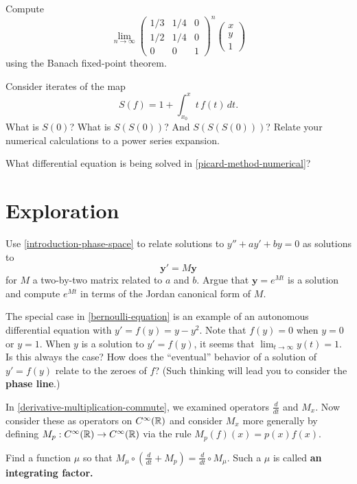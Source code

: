 \documentclass{homework}
\begin{document}
\begin{problem}
  Compute
  \[
    \lim_{n \to \infty} \begin{pmatrix} 1/3 & 1/4 & 0 \\ 1/2 & 1/4 & 0 \\ 0 & 0 & 1 \end{pmatrix}^n \begin{pmatrix} x \\ y \\ 1 \end{pmatrix}
  \]
  using the Banach fixed-point theorem.
\end{problem}

\begin{problem}\label{picard-method-numerical}Consider iterates of the map
  \[
    S(f) = 1 + \int_{x_0}^x t \, f(t) \, dt.
  \]
  What is $S(0)$?  What is $S(S(0))$?  And $S(S(S(0)))$?  Relate your numerical calculations to a power series expansion.
\end{problem}

\begin{problem}
  What differential equation is being solved in \ref{picard-method-numerical}?
\end{problem}

\section{Exploration}

\begin{problem}
  Use \ref{introduction-phase-space} to relate solutions to $y'' + ay' + by = 0$ as solutions to
  \[
    \mathbf{y}' = M\mathbf{y}
  \]
  for $M$ a two-by-two matrix related to $a$ and $b$.  Argue that $\mathbf{y} = e^{Mt}$ is a solution and compute $e^{Mt}$ in terms of the Jordan canonical form of $M$.
\end{problem}

\begin{problem}
  The special case in \ref{bernoulli-equation} is an example of an
  autonomous differential equation with $y' = f(y) = y - y^2$.  Note
  that $f(y) = 0$ when $y = 0$ or $y = 1$.  When $y$ is a solution to
  $y' = f(y)$, it seems that $\lim_{t \to \infty} y(t) = 1$.  Is this
  always the case?  How does the ``eventual'' behavior of a solution
  of $y' = f(y)$ relate to the zeroes of $f$?  (Such thinking will
  lead you to consider the \textbf{phase line}.)
\end{problem}

\begin{problem}\label{integrating-factor}In \ref{derivative-multiplication-commute}, we examined operators $\frac{d}{dt}$ and $M_x$.  Now consider these as operators on $C^\infty(\mathbb{R})$ and consider $M_x$ more generally by defining $M_p : C^\infty(\mathbb{R}) \to C^\infty(\mathbb{R})$ via the rule $M_p(f)(x) = p(x) f(x)$.

  Find a function $\mu$ so that \(
    M_\mu \circ (\displaystyle\frac{d}{dt} + M_p) = \displaystyle\frac{d}{dt} \circ M_\mu.
  \)
  Such a $\mu$ is called \textbf{an integrating factor.}
\end{problem}
\end{document}
